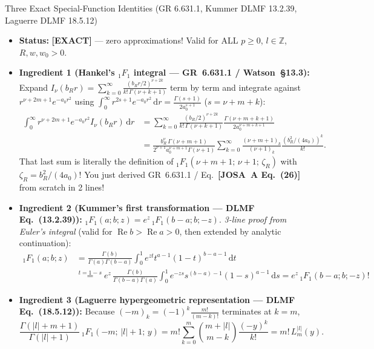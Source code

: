 \documentclass[10pt,letterpaper]{article}
\newcommand{\abs}[1]{\lvert #1 \rvert}
\newcommand{\dd}{\mathrm{d}}
\newcommand{\josa}[1]{\textbf{[JOSA~A Eq.~(#1)]}}
\newcommand{\tagexact}{\textcolor{forest}{\textbf{[EXACT]}}}
\numberwithin{equation}{section}
\begin{document}
\begin{approxbox}{Three Exact Special-Function Identities (GR 6.631.1, Kummer DLMF 13.2.39, Laguerre DLMF 18.5.12)}
\begin{itemize}[leftmargin=1.4em,itemsep=2pt,topsep=1pt]
  \item \textbf{Status:} \tagexact{} --- zero approximations! Valid for ALL $p \ge 0$, $l \in \mathbb{Z}$, $R, w, w_0 > 0$.
  \item \textbf{Ingredient 1 (Hankel's ${}_1F_1$ integral --- GR~6.631.1 / Watson~\S13.3):} Expand $I_\nu(b_R r) = \sum_{k=0}^\infty \frac{(b_R r/2)^{\nu+2k}}{k!\,\Gamma(\nu+k+1)}$ term by term and integrate against $r^{\nu+2m+1} e^{-a_0 r^2}$ using $\int_0^\infty r^{2s+1} e^{-a_0 r^2}\,\dd r = \frac{\Gamma(s+1)}{2 a_0^{s+1}}$ ($s = \nu + m + k$):
  \begin{align*}
    \int_0^\infty r^{\nu+2m+1} e^{-a_0 r^2} I_\nu(b_R r)\,\dd r
    &= \sum_{k=0}^\infty \frac{(b_R/2)^{\nu+2k}}{k!\,\Gamma(\nu+k+1)}\frac{\Gamma(\nu+m+k+1)}{2 a_0^{\nu+m+k+1}} \\
    &= \frac{b_R^\nu\,\Gamma(\nu+m+1)}{2^{\nu+1} a_0^{\nu+m+1}\Gamma(\nu+1)}\sum_{k=0}^\infty \frac{(\nu+m+1)_k}{(\nu+1)_k}\frac{(b_R^2/(4a_0))^k}{k!}.
  \end{align*}
  That last sum is literally the definition of ${}_1F_1(\nu+m+1;\,\nu+1;\,\zeta_R)$ with $\zeta_R = b_R^2/(4a_0)$! You just derived GR~6.631.1 / Eq.~\josa{26} from scratch in 2 lines!
  \item \textbf{Ingredient 2 (Kummer's first transformation --- DLMF Eq.~(13.2.39)):} ${}_1F_1(a; b; z) = e^z\,{}_1F_1(b-a; b; -z)$. \emph{3-line proof from Euler's integral} (valid for $\operatorname{Re} b > \operatorname{Re} a > 0$, then extended by analytic continuation):
  \begin{align*}
    {}_1F_1(a;b;z) &= \frac{\Gamma(b)}{\Gamma(a)\Gamma(b-a)}\int_0^1 e^{zt} t^{a-1}(1-t)^{b-a-1}\,\dd t \\
    &\overset{t=1-s}{=} e^z\,\frac{\Gamma(b)}{\Gamma(b-a)\Gamma(a)}\int_0^1 e^{-zs} s^{(b-a)-1}(1-s)^{a-1}\,\dd s = e^z\,{}_1F_1(b-a; b; -z)!
  \end{align*}
  \item \textbf{Ingredient 3 (Laguerre hypergeometric representation --- DLMF Eq.~(18.5.12)):} Because $(-m)_k = (-1)^k \frac{m!}{(m-k)!}$ terminates at $k = m$,
  \[
    \frac{\Gamma(\abs{l}+m+1)}{\Gamma(\abs{l}+1)}\,{}_1F_1(-m;\,\abs{l}+1;\,y)
    = m!\sum_{k=0}^m \binom{m+\abs{l}}{m-k}\frac{(-y)^k}{k!} = m!\,L_m^{\abs{l}}(y).
  \]
\end{itemize}
\end{approxbox}
\end{document}

